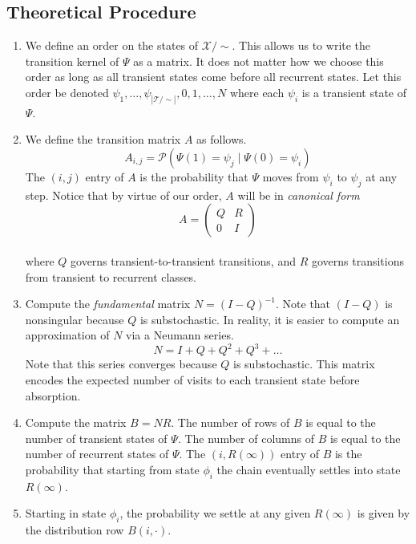\documentclass[a4paper]{article}
\begin{document}
	\subsection{Theoretical Procedure}
	\begin{enumerate}
		\item We define an order on the states of $\mathcal{X}/\sim$. This allows us to write the transition kernel of $\Psi$ as a matrix. It does not matter how we choose this order as long as all transient states come before all recurrent states. Let this order be denoted $\psi_{1}, \dots, \psi_{|\mathcal{T/\sim}|}, 0, 1, \dots, N$ where each $\psi_{i}$ is a transient state of $\Psi$.
		\item We define the transition matrix $A$ as follows.
		$$A_{i, j} = \mathcal{P}(\Psi(1) = \psi_{j} \mid \Psi(0) = \psi_{i})$$
		The $(i, j)$ entry of $A$ is the probability that $\Psi$ moves from $\psi_{i}$ to $\psi_{j}$ at any step. Notice that by virtue of our order, $A$ will be in \textit{canonical form}
		$$A = \begin{pmatrix}
			Q & R\\
			0 & I
		\end{pmatrix}$$\\
		where $Q$ governs transient-to-transient transitions, and $R$ governs transitions from transient to recurrent classes.
		\item Compute the \textit{fundamental} matrix $N = (I - Q)^{-1}$. Note that $(I - Q)$ is nonsingular because $Q$ is substochastic. In reality, it is easier to compute an approximation of $N$ via a Neumann series.
		$$N = I + Q + Q^{2} + Q^{3} + \dots$$
		Note that this series converges because $Q$ is substochastic. This matrix encodes the expected number of visits to each transient state before absorption.
		\item Compute the matrix $B = NR$. The number of rows of $B$ is equal to the number of transient states of $\Psi$. The number of columns of $B$ is equal to the number of recurrent states of $\Psi$. The $(i, R(\infty))$ entry of $B$ is the probability that starting from state $\phi_{i}$ the chain eventually settles into state $R(\infty)$.
		\item Starting in state $\phi_{i}$, the probability we settle at any given $R(\infty)$ is given by the distribution row $B(i, \cdot)$.
	\end{enumerate}
\end{document}
